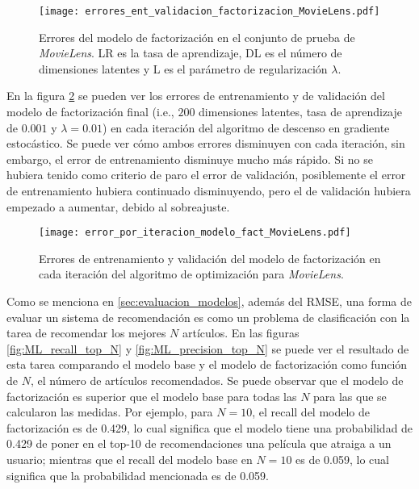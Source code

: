 \begin{figure}[H]
	\centering
 	\texttt{[image: errores\_ent\_validacion\_factorizacion\_MovieLens.pdf]}
 	\caption{Errores del modelo de factorización en el conjunto de prueba de \textit{MovieLens}. LR es la tasa de aprendizaje, DL es el número de dimensiones latentes y L es el parámetro de regularización $\lambda$.}
 	\label{fig:ML_modelo_fact_errores}
\end{figure}

En la figura \ref{fig:ML_modelo_fact_error_por_iter} se pueden ver los errores de entrenamiento y de validación del modelo de factorización final (i.e., $200$ dimensiones latentes, tasa de aprendizaje de $0.001$ y $\lambda = 0.01$) en cada iteración del algoritmo de descenso en gradiente estocástico. Se puede ver cómo ambos errores disminuyen con cada iteración, sin embargo, el error de entrenamiento disminuye mucho más rápido. Si no se hubiera tenido como criterio de paro el error de validación, posiblemente el error de entrenamiento hubiera continuado disminuyendo, pero el de validación hubiera empezado a aumentar, debido al sobreajuste.


\begin{figure}[H]
	\centering
 	\texttt{[image: error\_por\_iteracion\_modelo\_fact\_MovieLens.pdf]}
 	\caption{Errores de entrenamiento y validación del modelo de factorización en cada iteración del algoritmo de optimización para \textit{MovieLens}.}
 	\label{fig:ML_modelo_fact_error_por_iter}
\end{figure}

Como se menciona en \ref{sec:evaluacion_modelos}, además del RMSE, una forma de evaluar un sistema de recomendación es como un problema de clasificación con la tarea de recomendar los mejores $N$ artículos. En las figuras \ref{fig:ML_recall_top_N} y \ref{fig:ML_precision_top_N} se puede ver el resultado de esta tarea comparando el modelo base y el modelo de factorización como función de $N$, el número de artículos recomendados. Se puede observar que el modelo de factorización es superior que el modelo base para todas las $N$ para las que se calcularon las medidas. Por ejemplo, para $N = 10$, el recall del modelo de factorización es de 0.429, lo cual significa que el modelo tiene una probabilidad de 0.429 de poner en el top-10 de recomendaciones una película que atraiga a un usuario; mientras que el recall del modelo base en $N = 10$ es de 0.059, lo cual significa que la probabilidad mencionada es de 0.059.

